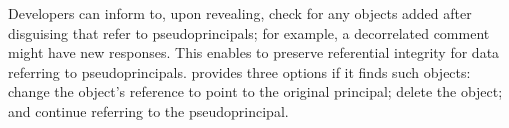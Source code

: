  Developers can inform \sys to, upon revealing, check for any objects
added after disguising that refer to pseudoprincipals; for example, a
decorrelated comment might have new responses. This enables \sys to preserve
referential integrity for data referring to pseudoprincipals. \sys
provides three options if it finds such objects: \one{} change the object's
reference to point to the original principal; \two{} delete the object; and
\three{} continue referring to the pseudoprincipal.

%
%
%
%
%
%
%
%


